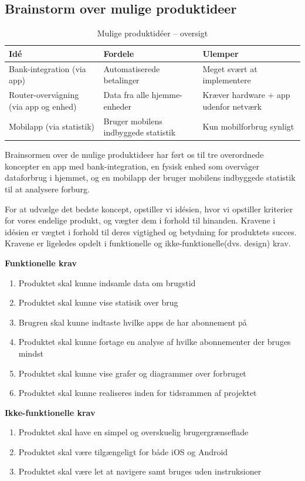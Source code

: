\subsection{Brainstorm over mulige produktideer}

\begin{table}[H]
\centering
\small
\label{tab:produktideer}
\begin{tabularx}{\textwidth}{XXX}
    \toprule
    \textbf{Idé} & \textbf{Fordele} & \textbf{Ulemper} \\
    \midrule
    Bank-integration (via app)     & Automatiserede betalinger                  & Meget svært at implementere \\
    Router-overvågning (via app og enhed)   & Data fra alle hjemme-enheder               & Kræver hardware + app udenfor netværk \\
    Mobilapp (via statistik)             & Bruger mobilens indbyggede statistik       & Kun mobilforbrug synligt \\
    \bottomrule
\end{tabularx}
\caption{Mulige produktidéer – oversigt}
\end{table} 

Brainsormen over de mulige produktideer har ført os til tre overordnede koncepter en app med bank-integration, en fysisk enhed som overvåger dataforbrug i hjemmet, og en mobilapp der bruger mobilens indbyggede statistik til at analysere forburg. 

For at udvælge det bedste koncept, opstiller vi idésien, hvor vi opstiller kriterier for vores endelige produkt, og vægter dem i forhold til hinanden. Kravene i idésien er vægtet i forhold til deres vigtighed og betydning for produktets succes. Kravene er ligeledes opdelt i funktionelle og ikke-funktionelle(dvs. design) krav.

\textbf{Funktionelle krav}
\begin{enumerate}
    \item Produktet skal kunne indsamle data om brugstid
    \item Produktet skal kunne vise statisik over brug
    \item Brugren skal kunne indtaste hvilke apps de har abonnement på
    \item Produktet skal kunne fortage en analyse af hvilke abonnementer der bruges mindst
    \item Produktet skal kunne vise grafer og diagrammer over forbruget
    \item Produktet skal kunne realiseres inden for tidsrammen af projektet 
\end{enumerate}
\textbf{Ikke-funktionelle krav}
\begin{enumerate}
    \item Produktet skal have en simpel og overskuelig brugergrænseflade
    \item Produktet skal være tilgængeligt for både iOS og Android
    \item Produktet skal være let at navigere samt bruges uden instruksioner
\end{enumerate}



